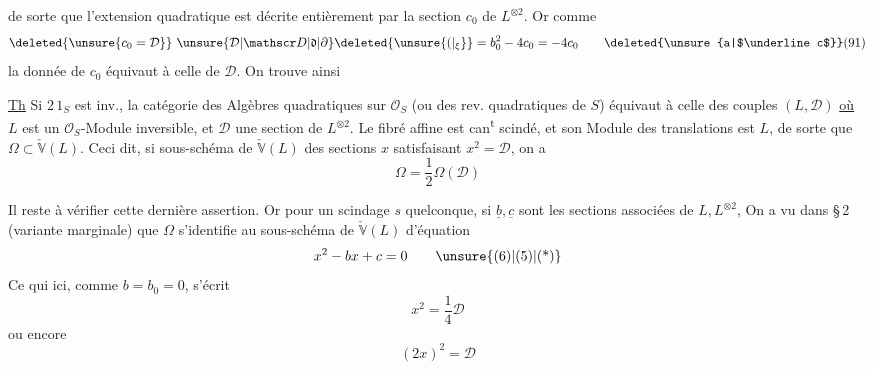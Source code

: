 de sorte que l'extension quadratique est décrite
entièrement par la section $c_0$ de $L^{\otimes2}$. Or comme
\[
\deleted{\unsure{c_0=\mathcal D}}\ \unsure{\mathcal D|\mathscr D|\mathfrak d|\partial}\deleted{\unsure{(|{}_{\xi}}}=b_0^2-4c_0=-4c_0\tag*{\deleted{\unsure{a|$\underline c$}}(91)}
\]
la donnée de $c_0$ équivaut à celle de $\mathcal D$. On
trouve ainsi

\uline{Th} Si $2\,1_S$ est inv., la catégorie des Algèbres
quadratiques sur $\mathcal O_S$ (ou  des rev. quadratiques
\inserted{$\Omega$} de $S$) équivaut à celle des couples $(L,\mathcal D)$
\uline{où} $L$ est un $\mathcal O_S$-Module inversible, et $\mathcal D$
une section de $L^{\otimes2}$.  Le fibré affine 
 est can\textsuperscript{t} scindé, et son Module des translations
est $L$, de sorte que $\Omega\subset\check{\mathbb V}(L)$\deleted{\unsure{)|$\xi$}}. Ceci
dit, si   sous-schéma de $\check{\mathbb V}(L)$
des sections $x$ satisfaisant $x^2=\mathcal D$, on a 
\[
\Omega=\frac12\Omega(\mathcal D)\tag*{(92)}
\]

Il reste à vérifier cette dernière assertion.
Or pour un scindage $s$ quelconque, si $\underline b,\underline c$ sont
les sections associées de $L,L^{\otimes2}$, On a vu
dans \S\,2 (variante marginale) que $\Omega$ s'identifie
au sous-schéma de $\check{\mathbb V}(L)$ d'équation
\[
x^2-bx+c=0\tag*{\unsure{(6)|(5)|(*)}}
\]
Ce qui ici,  comme $b=b_0=0$, s'écrit
\[
x^2=\frac14\mathcal D
\]
ou encore
\[
(2x)^2=\mathcal D
\]
